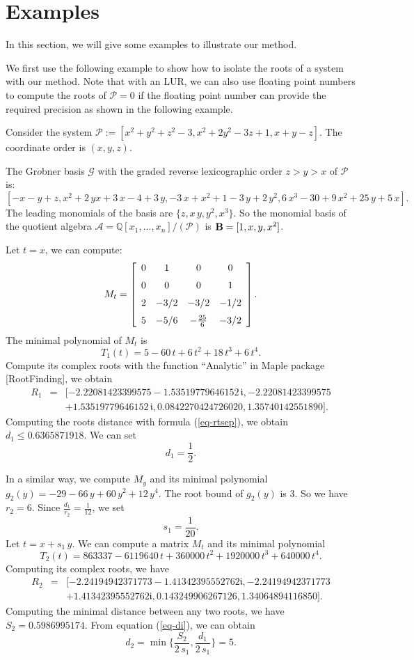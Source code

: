 \documentclass[amsthm]{JSC_LaTex_2007_Mar_12/elsart}
\def\bref#1{(\ref{#1})}
\def\Q{{\mathbb{Q}}}
\def\B{{\bf B}}
\def\PS{ {\mathcal{P}} }
\def\GB{{\mathcal{G}}}
\begin{document}
\section{Examples}
In this section, we will give some examples to illustrate our
method.

We first use the following  example to show how to isolate the roots
of a system with our method. Note that with an LUR, we can also use
floating point numbers to compute the roots of $\PS=0$ if the
floating point number can provide the required precision as shown in
the following example.

\begin{exmp} Consider the system
$\mathcal{P}:=[x^2+y^2+z^2-3,x^2+2y^2-3z+1,x+y-z].$ The coordinate order is $(x,y,z)$.

The Gr$\ddot{o}$bner basis $\GB$ with the graded reverse
lexicographic order $z>y>x$ of $\PS$ is: {\small
$$[-x-y+z,{x}^{2}+2\,yx+3\,x-4+3\,y,-3\,x+{x}^{2}+1-3\,y+2\,{y}^{2},6\,{
x}^{3}-30+9\,{x}^{2}+25\,y+5\,x].$$} The leading monomials of the
basis are $\{z,x\,y,y^2,x^3\}$. So the monomial basis of the
quotient algebra $\mathcal{A}=\Q[x_1,...,x_n]/(\PS)$ is $\B=[1, x,
y, x^2]$.

Let $t=x$, we can compute:
$$M_t=\left[ \begin {array}{cccc} 0&1&0&0\\ \noalign{\medskip}0&0&0&1\\ \noalign{\medskip}2&-3/2&-3/2&-1/2\\ \noalign{\medskip}5&-5/6&-{
\frac {25}{6}}&-3/2\end {array} \right].$$ The minimal polynomial of
$M_t$ is $$T_1(t)=5-60\,t+6\,t^2+18\,t^3+6\,t^4.$$ Compute its
complex roots with the function ``Analytic'' in Maple package
[RootFinding], we obtain
\begin{eqnarray*}
 R_1&=&[- 2.22081423399575-1.53519779646152\,\mathfrak{i}, - 2.22081423399575\\
 &&+ 1.53519779646152\,\mathfrak{i},
  0.0842270424726020, 1.35740142551890].
\end{eqnarray*}
Computing the roots distance with formula \bref{eq-rtsep}, we obtain
$d_1\le0.6365871918$. We can set $$d_1=\frac{1}{2}.$$

In a similar way, we compute $M_y$ and its minimal polynomial
$g_2(y)=-29-66\,y+60\,y^2+12\,y^4$. The root bound of $g_2(y)$ is
$3$. So we have $r_2=6$. Since $\frac{d_1}{r_2}=\frac{1}{12}$, we
set $$s_1=\frac{1}{20}.$$ Let $t=x+s_1\,y$. We can compute a matrix
$M_t$ and its minimal polynomial
$$T_2(t)=863337-6119640\,t+360000\,t^2+1920000\,t^3+640000\,t^4.$$
Computing its complex roots, we have
\begin{eqnarray*}
 R_2&=&[-2.24194942371773 -1.41342395552762\mathfrak{i}, -2.24194942371773\\
 &&+1.41342395552762 \mathfrak{i}, 0.143249906267126, 1.34064894116850].
\end{eqnarray*}
Computing the minimal distance between any two roots, we have
$S_2=0.5986995174$. From equation \bref{eq-di}, we can obtain
$$d_2=\min\{\frac{S_2}{2\,s_1},\frac{d_1}{2\,s_1}\}=5.$$



\end{exmp}
\end{document}
